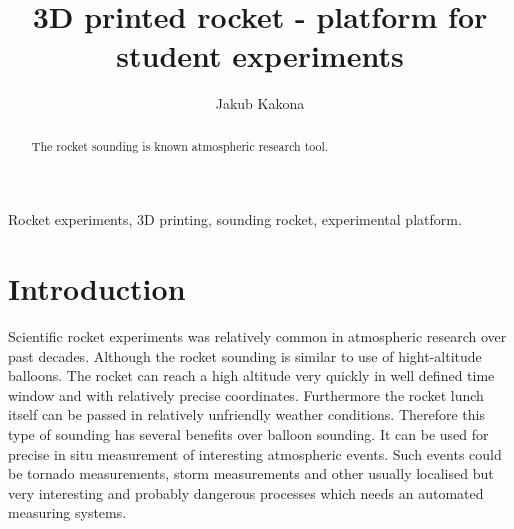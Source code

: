 \documentclass{poster16}
\begin{document}

%
\title{3D printed rocket - platform for student experiments}
%

%
\author{Jakub Kakona }
%


\maketitle


\begin{abstract}
The rocket sounding is known atmospheric research tool.
\end{abstract}

\begin{keywords}
Rocket experiments, 3D printing, sounding rocket, experimental platform.
\end{keywords}


\section{Introduction}

Scientific rocket experiments was relatively common in atmospheric research over past decades. Although the rocket sounding is similar to use of hight-altitude balloons. The rocket can reach a high altitude very quickly in well defined time window and with relatively precise coordinates. Furthermore the rocket lunch itself can be passed in relatively unfriendly weather conditions. Therefore this type of sounding has several benefits over balloon sounding. It can be used for precise in situ measurement of interesting atmospheric events. Such events could be tornado measurements, storm measurements and other usually localised but very interesting and probably dangerous processes which needs an automated measuring systems. 
\end{document}
